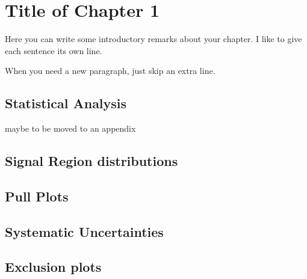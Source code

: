 

\chapter[Results][Top of Page Title]{Title of Chapter 1}

Here you can write some introductory remarks about your chapter.
I like to give each sentence its own line.

When you need a new paragraph, just skip an extra line.

\section{Statistical Analysis}

maybe to be moved to an appendix

\section{Signal Region distributions}

\section{Pull Plots}

\section{Systematic Uncertainties}

\section{Exclusion plots}
